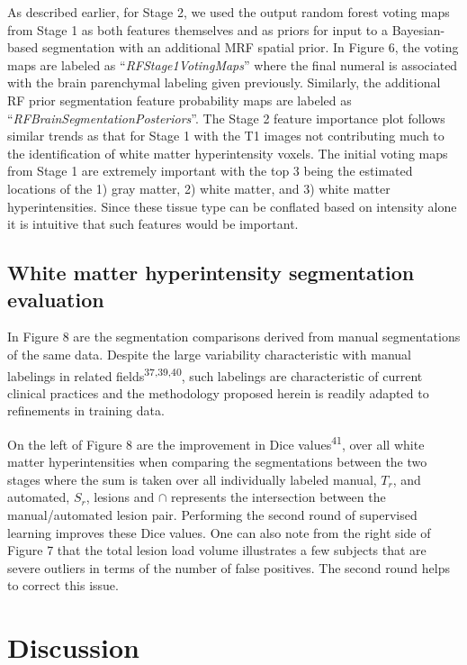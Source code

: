 \documentclass[11pt,]{article}
\begin{document}
As described earlier, for Stage 2, we used the output random forest
voting maps from Stage 1 as both features themselves and as priors for
input to a Bayesian-based segmentation with an additional MRF spatial
prior. In Figure 6, the voting maps are labeled as
``\emph{RFStage1VotingMaps}'' where the final numeral is associated with
the brain parenchymal labeling given previously. Similarly, the
additional RF prior segmentation feature probability maps are labeled as
``\emph{RFBrainSegmentationPosteriors}''. The Stage 2 feature importance
plot follows similar trends as that for Stage 1 with the T1 images not
contributing much to the identification of white matter hyperintensity
voxels. The initial voting maps from Stage 1 are extremely important
with the top 3 being the estimated locations of the 1) gray matter, 2)
white matter, and 3) white matter hyperintensities. Since these tissue
type can be conflated based on intensity alone it is intuitive that such
features would be important.

\subsection{White matter hyperintensity segmentation
evaluation}\label{white-matter-hyperintensity-segmentation-evaluation}

In Figure 8 are the segmentation comparisons derived from manual
segmentations of the same data. Despite the large variability
characteristic with manual labelings in related
fields\textsuperscript{37,39,40}, such labelings are characteristic of
current clinical practices and the methodology proposed herein is
readily adapted to refinements in training data.

On the left of Figure 8 are the improvement in Dice
values\textsuperscript{41}, over all white matter hyperintensities when
comparing the segmentations between the two stages where the sum is
taken over all individually labeled manual, \(T_r\), and automated,
\(S_r\), lesions and \(\cap\) represents the intersection between the
manual/automated lesion pair. Performing the second round of supervised
learning improves these Dice values. One can also note from the right
side of Figure 7 that the total lesion load volume illustrates a few
subjects that are severe outliers in terms of the number of false
positives. The second round helps to correct this issue.

\section{Discussion}\label{discussion}
\end{document}

